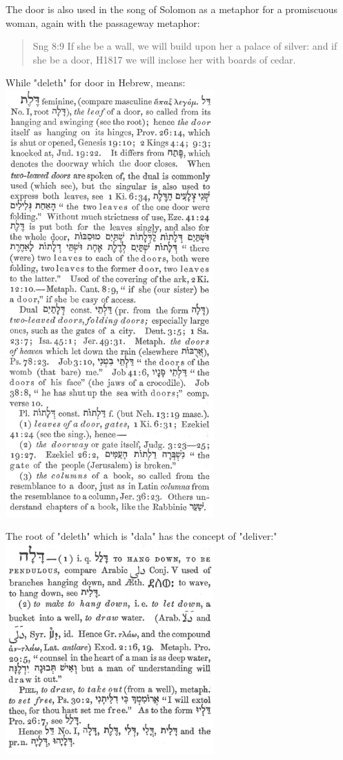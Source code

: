 \documentclass[11pt]{article}
\begin{document}
The door is also used in the song of Solomon as a metaphor for a promiscuous woman, again with the passageway metaphor:
\begin{quote}
Sng 8:9
If she be a wall, we will build upon her a palace of silver: and if she be a door, H1817 we will inclose her with boards of cedar.
\end{quote}
While "deleth" for door in Hebrew, means:  \newline
\includegraphics[width=8cm]{deleth_h1817}

The root of "deleth" which is "dala" has the concept of "deliver:" \newline
\includegraphics[width=8cm]{dala_h1802} \newline
\end{document}
